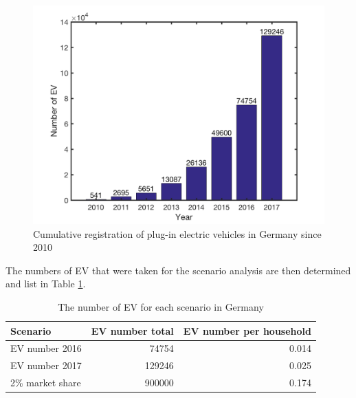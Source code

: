 \begin{figure}[h!]
	\centering
	\includegraphics[width=0.95\linewidth]{Figures/Germany_EV_number}
	\caption{Cumulative registration of plug-in electric vehicles in Germany since 2010 \cite{KBA2017}}
	\label{fig:Germany_EV_number}
\end{figure}

The numbers of EV that were taken for the scenario analysis are then determined and list in Table \ref{tab:ev-number-scenario-germany}.

\begin{table}[h!]
	\centering
	\begin{tabular}{l r r}
		\hline
		\textbf{Scenario} & \textbf{EV number total} & \textbf{EV number per household} \\
		\hline
		EV number 2016 &  \num{74754} & \num{0.014} \\
		EV number 2017 &  \num{129246} & \num{0.025} \\
		2\% market share &  \num{900000} & \num{0.174} \\
		\hline
	\end{tabular}
\caption{The number of EV for each scenario in Germany}\label{tab:ev-number-scenario-germany}
\end{table}

